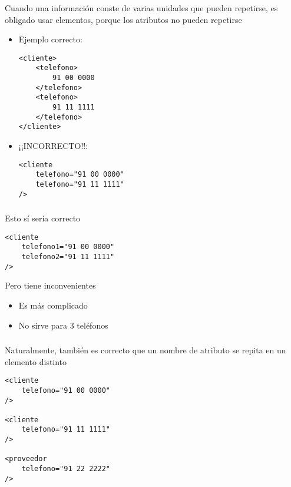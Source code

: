 \documentclass[ucs]{beamer}
\begin{document}
\begin{frame}[fragile]
\frametitle{}
Cuando una información conste de varias unidades que pueden repetirse,
es obligado usar elementos, porque los atributos no pueden repetirse

\begin{itemize}
\item
Ejemplo correcto:

  \begin{footnotesize}
  \begin{verbatim}
<cliente>
    <telefono>
        91 00 0000
    </telefono>
    <telefono>
        91 11 1111
    </telefono>
</cliente>
  \end{verbatim}
  \end{footnotesize}
\item
¡¡INCORRECTO!!: 

  \begin{footnotesize}
  \begin{verbatim}
<cliente
    telefono="91 00 0000"
    telefono="91 11 1111"
/>
  \end{verbatim}
  \end{footnotesize}
\end{itemize}

\end{frame}


\begin{frame}[fragile]
\frametitle{}
Esto sí sería correcto

  \begin{footnotesize}
  \begin{verbatim}
<cliente
    telefono1="91 00 0000"
    telefono2="91 11 1111"
/>
  \end{verbatim}
  \end{footnotesize}
Pero tiene inconvenientes
\begin{itemize}
\item
Es más complicado
\item
No sirve para 3 teléfonos
\end{itemize}

\end{frame}


\begin{frame}[fragile]
\frametitle{}
Naturalmente, también es correcto que un nombre de atributo se repita en un elemento distinto

  \begin{footnotesize}
  \begin{verbatim}
<cliente
    telefono="91 00 0000"
/>

<cliente
    telefono="91 11 1111"
/>

<proveedor
    telefono="91 22 2222"
/>

  \end{verbatim}
  \end{footnotesize}

\end{frame}
\end{document}
